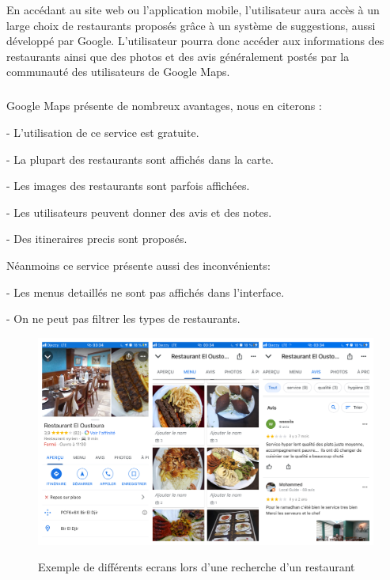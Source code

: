 En accédant au site web ou l'application mobile, l'utilisateur aura accès à un large choix de restaurants proposés grâce à un système de suggestions, aussi développé par Google. L'utilisateur pourra donc accéder aux informations des restaurants ainsi que des photos et des avis généralement postés par la communauté des utilisateurs de Google Maps.
\subparagraph*{}
Google Maps présente de nombreux avantages, nous en citerons :\bigskip
 
	\tab- L'utilisation de ce service est gratuite.\medskip

	\tab- La plupart des restaurants sont affichés dans la carte.\medskip

	\tab- Les images des restaurants sont parfois affichées.\medskip
	
	\tab- Les utilisateurs peuvent donner des avis et des notes.\medskip

	\tab- Des itineraires precis sont proposés.\bigskip

	
Néanmoins ce service présente aussi des inconvénients:\bigskip

	\tab- Les menus detaillés ne sont pas affichés dans l'interface.\medskip

	\tab- On ne peut pas filtrer les types de restaurants.\medskip


	\begin{figure}[!ht]

		\centering
		\includegraphics[width=4.5in]{images/Chapitre1/page_resto.jpg}
		\label{fig:label}
		\caption{Exemple de différents ecrans lors d'une recherche d'un restaurant }
	 \end{figure}
	 
\newpage

